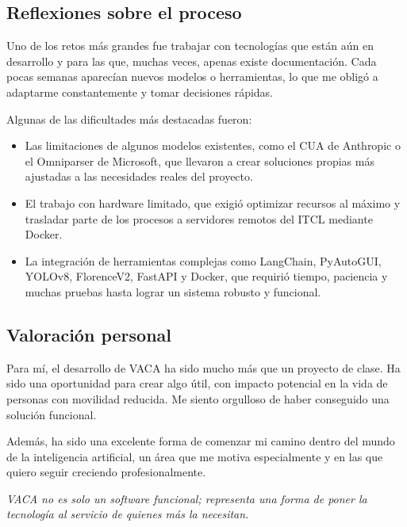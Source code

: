 \newpage

\subsection{Reflexiones sobre el proceso}

Uno de los retos más grandes fue trabajar con tecnologías que están aún en desarrollo y para las que, muchas veces, apenas existe documentación. Cada pocas semanas aparecían nuevos modelos o herramientas, lo que me obligó a adaptarme constantemente y tomar decisiones rápidas.

Algunas de las dificultades más destacadas fueron:

\begin{itemize}
    \item Las limitaciones de algunos modelos existentes, como el CUA de Anthropic o el Omniparser de Microsoft, que llevaron a crear soluciones propias más ajustadas a las necesidades reales del proyecto.

    \item El trabajo con hardware limitado, que exigió optimizar recursos al máximo y trasladar parte de los procesos a servidores remotos del ITCL mediante Docker.

    \item La integración de herramientas complejas como LangChain, PyAutoGUI, YOLOv8, FlorenceV2, FastAPI y Docker, que requirió tiempo, paciencia y muchas pruebas hasta lograr un sistema robusto y funcional.
\end{itemize}

\subsection{Valoración personal}

Para mí, el desarrollo de VACA ha sido mucho más que un proyecto de clase. Ha sido una oportunidad para crear algo útil, con impacto potencial en la vida de personas con movilidad reducida. Me siento orgulloso de haber conseguido una solución funcional.

Además, ha sido una excelente forma de comenzar mi camino dentro del mundo de la inteligencia artificial, un área que me motiva especialmente y en las que quiero seguir creciendo profesionalmente.

\vspace{1em}
\noindent
\textit{VACA no es solo un software funcional; representa una forma de poner la tecnología al servicio de quienes más la necesitan.}

